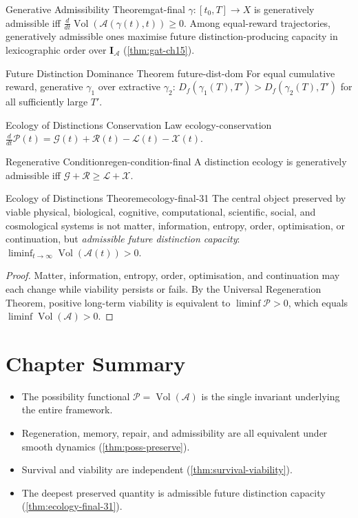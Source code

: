 \documentclass[12pt,twoside,openright]{book}
\newcommand{\adm}{\mathcal{A}}
\newcommand{\Vol}{\operatorname{Vol}}
\newenvironment{chapsummary}{%
  \begin{tcolorbox}[colback=DistBlue!5,colframe=DistBlue,
    title={\faBookOpen\enspace Summary},
    fonttitle=\sffamily\bfseries\color{white},
    attach boxed title to top left={yshift=-2mm,xshift=4mm},
    boxed title style={colback=DistBlue,rounded corners}]
  \begin{itemize}[nosep,leftmargin=*]}{%
  \end{itemize}\end{tcolorbox}}
\begin{document}
\begin{theorem}{Generative Admissibility Theorem}{gat-final}
  $\gamma:[t_0,T]\to X$ is generatively admissible iff
  $\frac{d}{dt}\Vol(\adm(\gamma(t),t))\ge0$.
  Among equal-reward trajectories, generatively admissible
  ones maximise future distinction-producing capacity in
  lexicographic order over $\mathbf{I}_\adm$
  (\cref{thm:gat-ch15}).
\end{theorem}

\begin{theorem}{Future Distinction Dominance Theorem}%
  {future-dist-dom}
  For equal cumulative reward, generative $\gamma_1$
  over extractive $\gamma_2$:
  $D_f(\gamma_1(T),T')>D_f(\gamma_2(T),T')$
  for all sufficiently large $T'$.
\end{theorem}

\begin{theorem}{Ecology of Distinctions Conservation Law}%
  {ecology-conservation}
  $\frac{d}{dt}\mathcal{P}(t)
  =\mathcal{G}(t)+\mathcal{R}(t)
  -\mathcal{L}(t)-\mathcal{X}(t)$.
\end{theorem}

\begin{corollary}{Regenerative Condition}{regen-condition-final}
  A distinction ecology is generatively admissible iff
  $\mathcal{G}+\mathcal{R}\ge\mathcal{L}+\mathcal{X}$.
\end{corollary}

\begin{theorem}{Ecology of Distinctions Theorem}{ecology-final-31}
  The central object preserved by viable physical,
  biological, cognitive, computational, scientific,
  social, and cosmological systems is not matter,
  information, entropy, order, optimisation, or
  continuation, but \emph{admissible future distinction
  capacity}: $\liminf_{t\to\infty}\Vol(\adm(t))>0$.
\end{theorem}
\begin{proof}
  Matter, information, entropy, order, optimisation,
  and continuation may each change while viability
  persists or fails. By the Universal Regeneration
  Theorem, positive long-term viability is equivalent
  to $\liminf\mathcal{P}>0$, which equals
  $\liminf\Vol(\adm)>0$.
\end{proof}

\section*{Chapter Summary}
\begin{chapsummary}
  \item The possibility functional
        $\mathcal{P}=\Vol(\adm)$ is the single
        invariant underlying the entire framework.
  \item Regeneration, memory, repair, and admissibility
        are all equivalent under smooth dynamics
        (\cref{thm:poss-preserve}).
  \item Survival and viability are independent
        (\cref{thm:survival-viability}).
  \item The deepest preserved quantity is admissible
        future distinction capacity
        (\cref{thm:ecology-final-31}).
\end{chapsummary}
\end{document}
